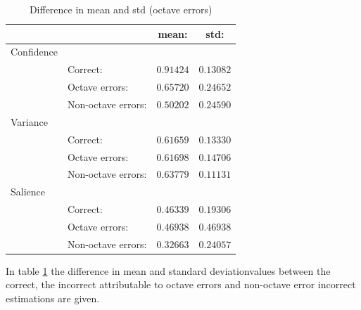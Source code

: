 \documentclass{article}
\begin{document}
\begin{table}[h]
    \begin{center}
        \begin{tabular}{ | l | l | c | c |}
            \hline
                        &                   &   mean:       &   std:        \\ \hline
            Confidence  &                   &               &               \\  \hline
                        &Correct:           &   $0.91424$   &   $0.13082$   \\  \hline
                        &Octave errors:     &   $0.65720$   &   $0.24652$   \\  \hline
                        &Non-octave errors: &   $0.50202$   &   $0.24590$   \\  \hline
            \hline
            Variance   &                    &               &               \\  \hline
                        &Correct:           &   $0.61659$   &   $0.13330$   \\  \hline
                        &Octave errors:     &   $0.61698$   &   $0.14706$   \\  \hline
                        &Non-octave errors: &   $0.63779$   &   $0.11131$   \\  \hline
 
           Salience   &                     &               &               \\  \hline
                        &Correct:           &   $0.46339$   &   $0.19306$   \\  \hline
                        &Octave errors:     &   $0.46938$   &   $0.46938$   \\  \hline
                        &Non-octave errors: &   $0.32663$   &   $0.24057$   \\  \hline
        \end{tabular}
        \caption{Difference in mean and std (octave errors)}
        \label{table:msdiffOct_cvs}
    \end{center}
\end{table}
In table \ref{table:msdiffOct_cvs} the difference in mean and standard deviationvalues between the correct, the incorrect attributable to octave errors and non-octave error incorrect estimations are given. 
\end{document}
